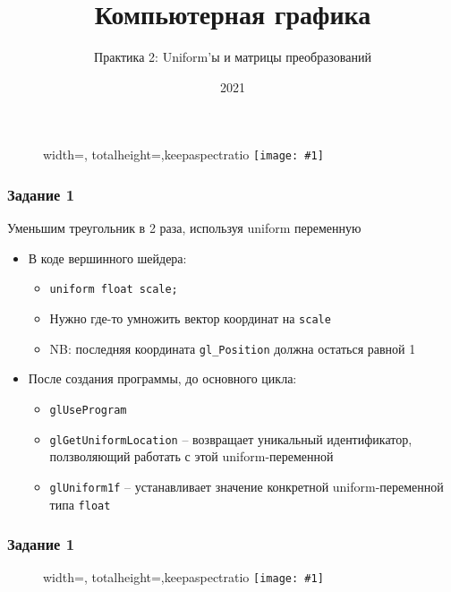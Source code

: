\documentclass{beamer}
\title{Компьютерная графика}
\subtitle{Практика 2: Uniform'ы и матрицы преобразований}
\date{2021}
\newcommand{\slideimage}[1]{
  \begin{figure}
    \begin{adjustbox}{width=\textwidth, totalheight=\textheight-2\baselineskip-2\baselineskip,keepaspectratio}
      \texttt{[image: \#1]}
    \end{adjustbox}
  \end{figure}
}
\begin{document}
\frame{\titlepage}

\begin{frame}
\slideimage{0.png}
\end{frame}

\begin{frame}[fragile]
\frametitle{Задание 1}
Уменьшим треугольник в 2 раза, используя uniform переменную
\begin{itemize}
\item В коде вершинного шейдера:
\begin{itemize}
\item \verb|uniform float scale;|
\item Нужно где-то умножить вектор координат на \verb|scale|
\item NB: последняя координата \verb|gl_Position| должна остаться равной 1
\end{itemize}
\item После создания программы, до основного цикла:
\begin{itemize}
\item \verb|glUseProgram|
\item \verb|glGetUniformLocation| -- возвращает уникальный идентификатор, ползволяющий работать с этой uniform-переменной
\item \verb|glUniform1f| -- устанавливает значение конкретной uniform-переменной типа \verb|float|
\end{itemize}
\end{itemize}
\end{frame}

\begin{frame}
\frametitle{Задание 1}
\slideimage{1.png}
\end{frame}
\end{document}
